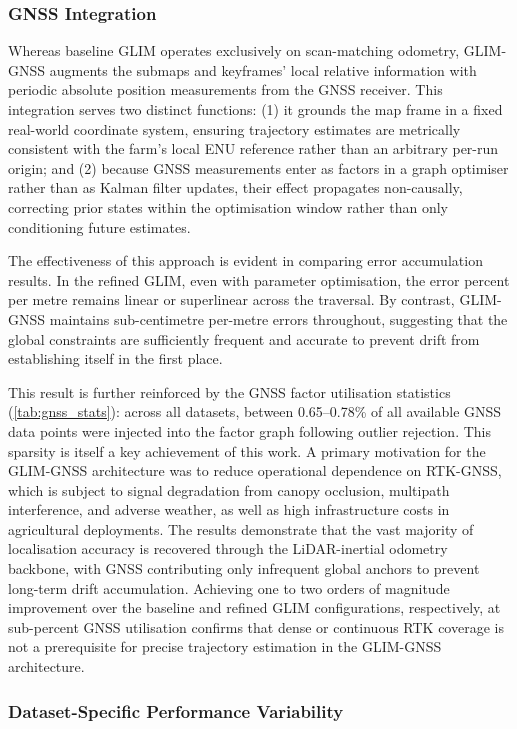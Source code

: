 \subsubsection{GNSS Integration}

Whereas baseline GLIM operates exclusively on scan-matching odometry, GLIM-GNSS augments the submaps and keyframes' local relative information with periodic absolute position measurements from the GNSS receiver. This integration serves two distinct functions: (1) it grounds the map frame in a fixed real-world coordinate system, ensuring trajectory estimates are metrically consistent with the farm's local ENU reference rather than an arbitrary per-run origin; and (2) because GNSS measurements enter as factors in a graph optimiser rather than as Kalman filter updates, their effect propagates non-causally, correcting prior states within the optimisation window rather than only conditioning future estimates.

The effectiveness of this approach is evident in comparing error accumulation results. In the refined GLIM, even with parameter optimisation, the error percent per metre remains linear or superlinear across the traversal. By contrast, GLIM-GNSS maintains sub-centimetre per-metre errors throughout, suggesting that the global constraints are sufficiently frequent and accurate to prevent drift from establishing itself in the first place.

This result is further reinforced by the GNSS factor utilisation statistics (\cref{tab:gnss_stats}): across all datasets, between 0.65--0.78\% of all available GNSS data points were injected into the factor graph following outlier rejection. This sparsity is itself a key achievement of this work. A primary motivation for the GLIM-GNSS architecture was to reduce operational dependence on RTK-GNSS, which is subject to signal degradation from canopy occlusion, multipath interference, and adverse weather, as well as high infrastructure costs in agricultural deployments. The results demonstrate that the vast majority of localisation accuracy is recovered through the LiDAR-inertial odometry backbone, with GNSS contributing only infrequent global anchors to prevent long-term drift accumulation. Achieving one to two orders of magnitude improvement over the baseline and refined GLIM configurations, respectively, at sub-percent GNSS utilisation confirms that dense or continuous RTK coverage is not a prerequisite for precise trajectory estimation in the GLIM-GNSS architecture.

\subsubsection{Dataset-Specific Performance Variability}

